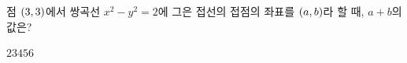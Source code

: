 점 $(3{,}\mkern3mu\mathopen{}3)$에서 쌍곡선 $x^2-y^2=2$에 그은 접선의 접점의 좌표를 $(a{,}\mkern3mu\mathopen{}b)$라 할 때, $a+b$의 값은?
\begin{choices32}{$2$}{$3$}{$4$}{$5$}{$6$}\end{choices32}
